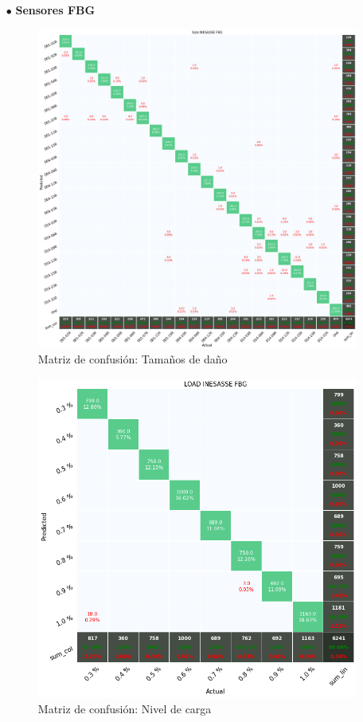 \begin{itemize}
    \item[$\bullet$] \textbf{Sensores FBG}

    \begin{figure}[H]
        \centering
        \includegraphics[width=125mm]{3/Fotos/Ty_Si_INESASSE_confusion.png}
        \captionsetup{justification=centering,margin=1.25cm}
        \caption{Matriz de confusión: Tamaños de daño}
        \label{fig:CM_FBG_Ty_Si}
    \end{figure} 

    \begin{figure}[H]
        \centering
        \includegraphics[width=125mm]{3/Fotos/Load_INESASSE_confusion.png}
        \captionsetup{justification=centering,margin=1.25cm}
        \caption{Matriz de confusión: Nivel de carga}
        \label{fig:CM_FBG_Load}
    \end{figure}  
  

\end{itemize}
